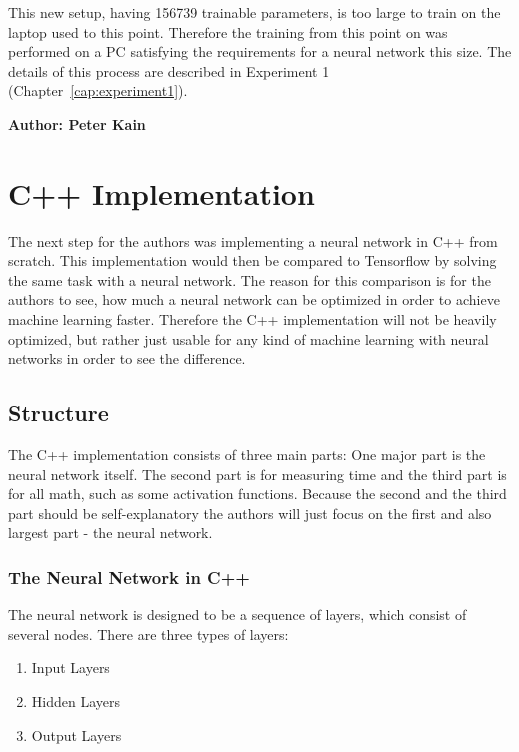 This new setup, having 156739 trainable parameters, is too large to train on the laptop used to this point. Therefore the training from this point on was performed on a PC satisfying the requirements for a neural network this size. The details of this process are described in Experiment 1 (Chapter~\ref{cap:experiment1}).

\vspace{5mm}
\noindent
\textbf{Author: Peter Kain}

\section{C++ Implementation}

The next step for the authors was implementing a neural network in C++ from scratch. This implementation would then be compared to Tensorflow by solving the same task with a neural network. The reason for this comparison is for the authors to see, how much a neural network can be optimized in order to achieve machine learning faster. Therefore the C++ implementation will not be heavily optimized, but rather just usable for any kind of machine learning with neural networks in order to see the difference.

\subsection{Structure}

The C++ implementation consists of three main parts: One major part is the neural network itself. The second part is for measuring time and the third part is for all math, such as some activation functions. Because the second and the third part should be self-explanatory the authors will just focus on the first and also largest part - the neural network.

\subsubsection{The Neural Network in C++}

The neural network is designed to be a sequence of layers, which consist of several nodes. There are three types of layers:

\begin{enumerate}
	\item Input Layers
	\item Hidden Layers
	\item Output Layers
\end{enumerate}

